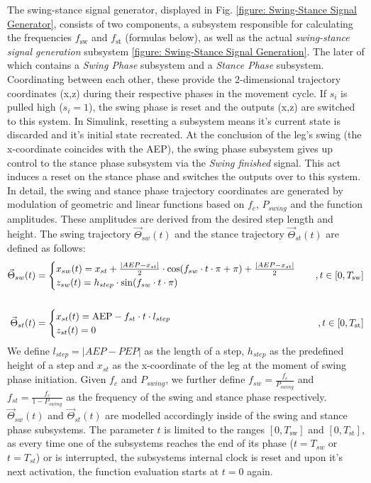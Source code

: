 The swing-stance signal generator, displayed in Fig. \ref{figure: Swing-Stance Signal Generator}, consists of two components, a subsystem responsible for calculating the frequencies $f_\text{sw}$ and $f_\text{st}$ (formulas below), as well as the actual \emph{swing-stance signal generation} subsystem \ref{figure: Swing-Stance Signal Generation}.
The later of which contains a \textit{Swing Phase} subsystem and a \textit{Stance Phase} subsystem.
Coordinating between each other, these provide the 2-dimensional trajectory coordinates (x,z) during their respective phases in the movement cycle.
If $s_i$ is pulled high ($s_i=1$), the swing phase is reset and the outputs (x,z) are switched to this system.
In Simulink, resetting a subsystem means it's current state is discarded and it's initial state recreated.
At the conclusion of the leg's swing (the x-coordinate coincides with the AEP), the swing phase subsystem gives up control to the stance phase subsystem via the \textit{Swing finished} signal.
This act induces a reset on the stance phase and switches the outputs over to this system.
\\
In detail, the swing and stance phase trajectory coordinates are generated by modulation of geometric and linear functions based on $f_c$, $P_{swing}$ and the function amplitudes.
These amplitudes are derived from the desired step length and height.
The swing trajectory $\vec{\Theta}_{sw}(t)$ and the stance trajectory $\vec{\Theta}_{st}(t)$ are defined as follows:
\begin{align}
	\vec{\Theta}_{sw}(t) & = 
	\begin{cases}
		x_{sw}(t) = x_{st} + \frac{|AEP - x_{st}|}{2} \cdot \cos(f_{sw} \cdot t \cdot \pi + \pi) + \frac{|AEP - x_{st}|}{2} \\
		z_{sw}(t) = h_{step} \cdot \sin(f_{sw} \cdot t \cdot \pi) \\
	\end{cases} & , t \in [0,T_\text{sw}] \\
	\notag \\
	\vec{\Theta}_{st}(t) & =
	\begin{cases}
		x_{st}(t) = \text{AEP} - f_{st} \cdot t \cdot l_{step}\\
		z_{st}(t) = 0
	\end{cases} & , t \in [0, T_\text{st}]    
\end{align}
We define $l_{step} = |AEP - PEP|$ as the length of a step, $h_{step}$ as the predefined height of a step and $x_{st}$ as the x-coordinate of the leg at the moment of swing phase initiation.
Given $f_c$ and $P_{swing}$, we further define $f_{sw} = \frac{f_c}{P_{swing}}$ and $f_{st} = \frac{f_c}{1-P_{swing}}$ as the frequency of the swing and stance phase respectively.
$\vec{\Theta}_{sw}(t)$ and $\vec{\Theta}_{st}(t)$ are modelled accordingly inside of the swing and stance phase subsystems.
The parameter $t$ is limited to the ranges $[0,T_\text{sw}]$ and $[0, T_\text{st}]$, as every time one of the subsystems reaches the end of its phase ($t=T_{sw}$ or $t=T_{st}$) or is interrupted, the subsystems internal clock is reset and upon it's next activation, the function evaluation starts at $t=0$ again.

